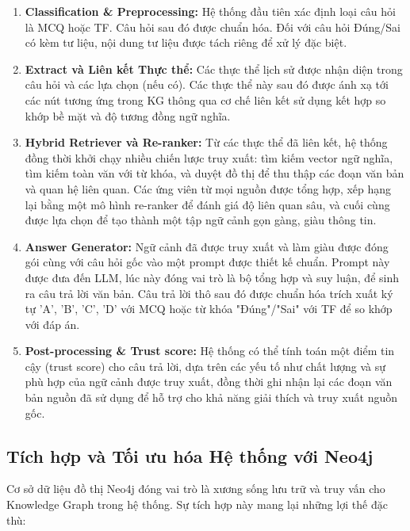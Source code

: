 \begin{enumerate}
    \item \textbf{Classification \& Preprocessing:} Hệ thống đầu tiên xác định loại câu hỏi là MCQ hoặc TF. Câu hỏi sau đó được chuẩn hóa. Đối với câu hỏi Đúng/Sai có kèm tư liệu, nội dung tư liệu được tách riêng để xử lý đặc biệt.

    \item \textbf{Extract và Liên kết Thực thể:} Các thực thể lịch sử được nhận diện trong câu hỏi và các lựa chọn (nếu có). Các thực thể này sau đó được ánh xạ tới các nút tương ứng trong KG thông qua cơ chế liên kết sử dụng kết hợp so khớp bề mặt và độ tương đồng ngữ nghĩa.

    \item \textbf{Hybrid Retriever và Re-ranker:} Từ các thực thể đã liên kết, hệ thống đồng thời khởi chạy nhiều chiến lược truy xuất: tìm kiếm vector ngữ nghĩa, tìm kiếm toàn văn với từ khóa, và duyệt đồ thị để thu thập các đoạn văn bản và quan hệ liên quan. Các ứng viên từ mọi nguồn được tổng hợp, xếp hạng lại bằng một mô hình re-ranker để đánh giá độ liên quan sâu, và cuối cùng được lựa chọn để tạo thành một tập ngữ cảnh gọn gàng, giàu thông tin.

    \item \textbf{Answer Generator:} Ngữ cảnh đã được truy xuất và làm giàu được đóng gói cùng với câu hỏi gốc vào một prompt được thiết kế chuẩn. Prompt này được đưa đến LLM, lúc này đóng vai trò là bộ tổng hợp và suy luận, để sinh ra câu trả lời văn bản. Câu trả lời thô sau đó được chuẩn hóa trích xuất ký tự 'A', 'B', 'C', 'D' với MCQ hoặc từ khóa "Đúng"/"Sai" với TF để so khớp với đáp án.

    \item \textbf{Post-processing \& Trust score:} Hệ thống có thể tính toán một điểm tin cậy (trust score) cho câu trả lời, dựa trên các yếu tố như chất lượng và sự phù hợp của ngữ cảnh được truy xuất, đồng thời ghi nhận lại các đoạn văn bản nguồn đã sử dụng để hỗ trợ cho khả năng giải thích và truy xuất nguồn gốc.
\end{enumerate}

\subsection{Tích hợp và Tối ưu hóa Hệ thống với Neo4j}

Cơ sở dữ liệu đồ thị Neo4j đóng vai trò là xương sống lưu trữ và truy vấn cho Knowledge Graph trong hệ thống. Sự tích hợp này mang lại những lợi thế đặc thù:

